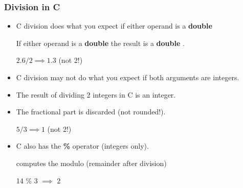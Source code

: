 \begin{frame}
\frametitle{Division in C}

\begin{itemize}
\item

C division does what you expect if either operand is a {\bf double}

If either operand is a {\bf double} the result is a {\bf double} . 

$ 2.6 / 2 \implies 1.3 $  (not 2!)

\item

C division may not do what you expect if both arguments are integers.

\item

The result of dividing 2 integers in C is an integer.

\item

The fractional part is discarded (not rounded!).

$ 5 / 3 \implies 1 $  (not 2!)

\item

C also has the {\bf \%} operator (integers only).

computes the modulo (remainder after division)

14 \% 3 $\implies$ 2

\end{itemize}
\end{frame}

